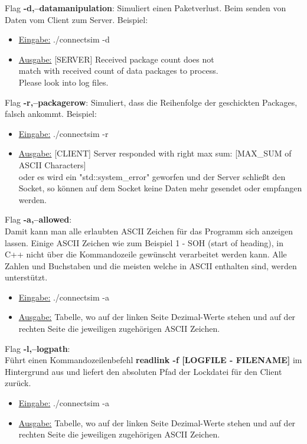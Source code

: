 \documentclass{article}
\begin{document}
Flag \textbf{-d,--datamanipulation}:\newline
Simuliert einen Paketverlust. Beim senden von Daten vom Client zum Server.
Beispiel: 
\begin{itemize}
	\item \underline{Eingabe:} ./connectsim -d
	\item \underline{Ausgabe:} [SERVER] Received package count does not\\ match with received count of data packages to process.
	\\ Please look into log files.\\
\end{itemize}

Flag \textbf{-r,--packagerow}:\newline
Simuliert, dass die Reihenfolge der geschickten Packages, falsch ankommt.
Beispiel: 
\begin{itemize}
	\item \underline{Eingabe:} ./connectsim -r
	\item \underline{Ausgabe:} [CLIENT] Server responded with right max sum: [MAX\_SUM of ASCII Characters]\\ oder
	es wird ein "std::system\_error" geworfen und der Server schließt den Socket, so können auf dem Socket keine Daten mehr
	gesendet oder empfangen werden.
\end{itemize}

\break

Flag \textbf{-a,--allowed}:\\
Damit kann man alle erlaubten ASCII Zeichen für das Programm sich anzeigen lassen. Einige ASCII Zeichen wie zum Beispiel 1 - SOH (start of heading), in C++ nicht über die Kommandozeile gewünscht verarbeitet werden kann. Alle Zahlen und Buchstaben und die meisten welche in ASCII enthalten sind, werden unterstützt.

\begin{itemize}
	\item \underline{Eingabe:} ./connectsim -a
	\item \underline{Ausgabe:} Tabelle, wo auf der linken Seite Dezimal-Werte stehen und auf der rechten Seite die jeweiligen zugehörigen ASCII Zeichen.\\
\end{itemize}

Flag \textbf{-l,--logpath}:\\
Führt einen Kommandozeilenbefehl \textbf{readlink -f [LOGFILE - FILENAME]} im Hintergrund aus und liefert
den absoluten Pfad der Lockdatei für den Client zurück.
\begin{itemize}
	\item \underline{Eingabe:} ./connectsim -a
	\item \underline{Ausgabe:} Tabelle, wo auf der linken Seite Dezimal-Werte stehen und auf der rechten Seite die jeweiligen zugehörigen ASCII Zeichen.\\
\end{itemize}
\end{document}
